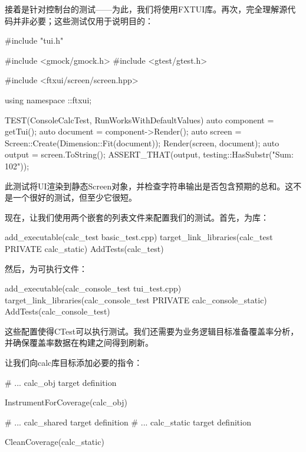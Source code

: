 接着是针对控制台的测试——为此，我们将使用FXTUI库。再次，完全理解源代码并非必要；这些测试仅用于说明目的：


\begin{cmake}
#include "tui.h"

#include <gmock/gmock.h>
#include <gtest/gtest.h>

#include <ftxui/screen/screen.hpp>

using namespace ::ftxui;

TEST(ConsoleCalcTest, RunWorksWithDefaultValues) {
    auto component = getTui();
    auto document = component->Render();
    auto screen = Screen::Create(Dimension::Fit(document));
    Render(screen, document);
    auto output = screen.ToString();
    ASSERT_THAT(output, testing::HasSubstr("Sum: 102"));
}
\end{cmake}

此测试将UI渲染到静态Screen对象，并检查字符串输出是否包含预期的总和。这不是一个很好的测试，但至少它很短。

现在，让我们使用两个嵌套的列表文件来配置我们的测试。首先，为库：


\begin{cmake}
add_executable(calc_test basic_test.cpp)
target_link_libraries(calc_test PRIVATE calc_static)
AddTests(calc_test)
\end{cmake}

然后，为可执行文件：


\begin{cmake}
add_executable(calc_console_test tui_test.cpp)
target_link_libraries(calc_console_test
                      PRIVATE calc_console_static)
AddTests(calc_console_test)
\end{cmake}

这些配置使得CTest可以执行测试。我们还需要为业务逻辑目标准备覆盖率分析，并确保覆盖率数据在构建之间得到刷新。

让我们向calc库目标添加必要的指令：


\begin{cmake}
# ... calc_obj target definition

InstrumentForCoverage(calc_obj)

# ... calc_shared target definition
# ... calc_static target definition

CleanCoverage(calc_static)
\end{cmake}

